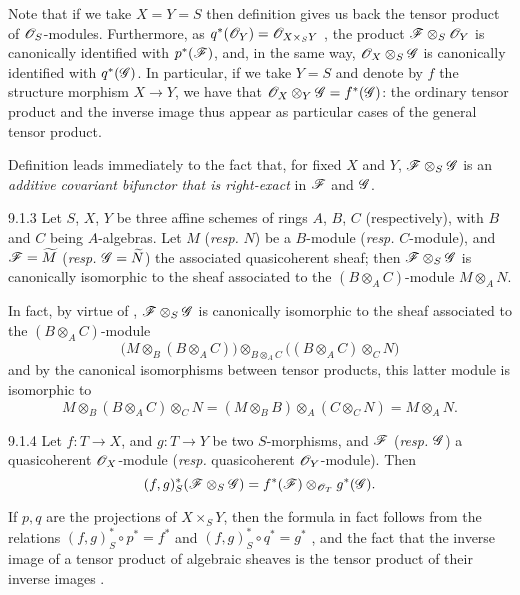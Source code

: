 \documentclass[10pt,oneside]{book}
\begin{document}
Note that if we take $X=Y=S$ then definition  gives us back the tensor
product of $\mathscr{O}_S$-modules. Furthermore, as $q^*(\mathscr{O}_Y)=\mathscr{O}_{X\times_S Y}$
, the product $\mathscr{F}\otimes_S\mathscr{O}_Y$ is canonically
identified with $p^*(\mathscr{F})$, and, in the same way,
$\mathscr{O}_X\otimes_S\mathscr{G}$ is canonically identified with $q^*(\mathscr{G})$. In
particular, if we take $Y=S$ and denote by $f$ the structure morphism $X\to Y$,
we have that $\mathscr{O}_X\otimes_Y\mathscr{G}=f^*(\mathscr{G})$: the ordinary tensor
product and the inverse image thus appear as particular cases of the general
tensor product.

Definition  leads immediately to the fact that, for fixed $X$ and
$Y$, $\mathscr{F}\otimes_S\mathscr{G}$ is an \emph{additive covariant bifunctor that
is right-exact} in $\mathscr{F}$ and $\mathscr{G}$.

\begin{envs}[Proposition]{9.1.3}
\label{prop-1.9.1.3}
Let $S$, $X$, $Y$ be three affine schemes of rings
$A$, $B$, $C$ (respectively), with $B$ and $C$ being $A$-algebras. Let $M$
(\emph{resp.} $N$) be a $B$-module (\emph{resp.} $C$-module), and
$\mathscr{F}=\widetilde{M}$ (\emph{resp.} $\mathscr{G}=\widetilde{N}$) the
associated quasicoherent sheaf; then $\mathscr{F}\otimes_S\mathscr{G}$ is
canonically isomorphic to the sheaf associated to the $(B\otimes_A C)$-module
$M\otimes_A N$.
\end{envs}

In fact, by virtue of , $\mathscr{F}\otimes_S\mathscr{G}$
is canonically isomorphic to the sheaf associated to the $(B\otimes_A C)$-module
\[
  \big(M\otimes_B(B\otimes_A C)\big)\otimes_{B\otimes_A C}\big((B\otimes_A C)\otimes_C N\big)
\]
and by the canonical isomorphisms between tensor
products, this latter module is isomorphic to
\[
  M\otimes_B(B\otimes_A C)\otimes_C N=(M\otimes_B B)\otimes_A(C\otimes_C N)=M\otimes_A N.
\]

\begin{envs}[Proposition]{9.1.4}
\label{prop-1.9.1.4}
Let $f:T\to X$, and $g:T\to Y$ be
two $S$-morphisms, and $\mathscr{F}$ (\emph{resp.} $\mathscr{G}$) a quasicoherent
$\mathscr{O}_X$-module (\emph{resp.} quasicoherent $\mathscr{O}_Y$-module). Then
\[
  (f,g)^*_S(\mathscr{F}\otimes_S\mathscr{G})=f^*(\mathscr{F})\otimes_{\mathscr{O}_T}g^*(\mathscr{G}).
\]
\end{envs}

If $p,q$ are the projections of $X\times_S Y$, then the formula in fact follows
from the relations $(f,g)^*_S\circ p^*=f^*$ and
$(f,g)^*_S\circ q^*=g^*$ , and the fact that the inverse
image of a tensor product of algebraic sheaves is the tensor product of their inverse
images .
\end{document}
